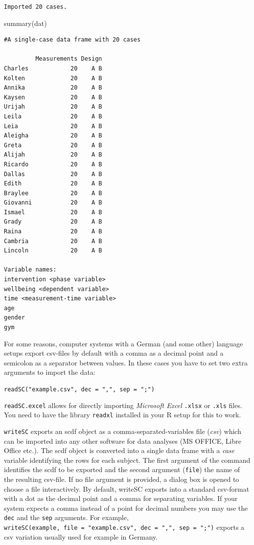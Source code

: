 \documentclass[
]{book}
\newenvironment{Shaded}{\begin{snugshade}}{\end{snugshade}}
\newcommand{\FunctionTok}[1]{\textcolor[rgb]{0.00,0.00,0.00}{#1}}
\newcommand{\NormalTok}[1]{#1}
\begin{document}
\begin{verbatim}
Imported 20 cases.
\end{verbatim}

\begin{Shaded}
\begin{Highlighting}[]
\FunctionTok{summary}\NormalTok{(dat)}
\end{Highlighting}
\end{Shaded}

\begin{verbatim}
#A single-case data frame with 20 cases

         Measurements Design
Charles            20    A B
Kolten             20    A B
Annika             20    A B
Kaysen             20    A B
Urijah             20    A B
Leila              20    A B
Leia               20    A B
Aleigha            20    A B
Greta              20    A B
Alijah             20    A B
Ricardo            20    A B
Dallas             20    A B
Edith              20    A B
Braylee            20    A B
Giovanni           20    A B
Ismael             20    A B
Grady              20    A B
Raina              20    A B
Cambria            20    A B
Lincoln            20    A B

Variable names:
intervention <phase variable>
wellbeing <dependent variable>
time <measurement-time variable>
age
gender
gym
\end{verbatim}

For some reasons, computer systems with a German (and some other) language setups export csv-files by default with a comma as a decimal point and a semicolon as a separator between values. In these cases you have to set two extra arguments to import the data:

\texttt{readSC("example.csv",\ dec\ =\ ",",\ sep\ =\ ";")}

\texttt{readSC.excel} allows for directly importing \emph{Microsoft Excel} \texttt{.xlsx} or \texttt{.xls} files. You need to have the library \texttt{readxl} installed in your R setup for this to work.

\texttt{writeSC} exports an scdf object as a comma-separated-variables file (\emph{csv}) which can be imported into any other software for data analyses (MS OFFICE, Libre Office etc.). The scdf object is converted into a single data frame with a \emph{case} variable identifying the rows for each subject. The first argument of the command identifies the scdf to be exported and the second argument (\texttt{file}) the name of the resulting csv-file. If no file argument is provided, a dialog box is opened to choose a file interactively. By default, writeSC exports into a standard csv-format with a dot as the decimal point and a comma for separating variables. If your system expects a comma instead of a point for decimal numbers you may use the \texttt{dec} and the \texttt{sep} arguments. For example, \texttt{writeSC(example,\ file\ =\ "example.csv",\ dec\ =\ ",",\ sep\ =\ ";")} exports a csv variation usually used for example in Germany.
\end{document}
